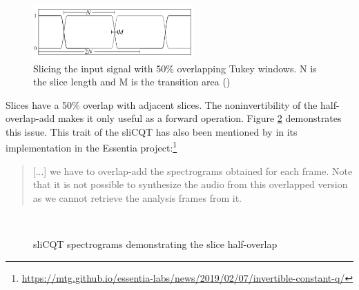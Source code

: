 \documentclass[report.tex]{subfiles}
\begin{document}
\begin{figure}[ht]
	\centering
	\includegraphics[width=0.55\textwidth]{./images-misc/slicq_windows.png}
	\caption{Slicing the input signal with 50\% overlapping Tukey windows. N is the slice length and M is the transition area (\cite{slicq})}
	\label{fig:slicqtukeys}
\end{figure}

Slices have a 50\% overlap with adjacent slices. The noninvertibility of the half-overlap-add makes it only useful as a forward operation. Figure \ref{fig:slicqoverlaps} demonstrates this issue. This trait of the sliCQT has also been mentioned by in its implementation in the Essentia project:\footnote{\url{https://mtg.github.io/essentia-labs/news/2019/02/07/invertible-constant-q/}}

\begin{quote}
	[...] we have to overlap-add the spectrograms obtained for each frame. Note that it is not possible to synthesize the audio from this overlapped version as we cannot retrieve the analysis frames from it.
\end{quote}

\begin{figure}[ht]
	\centering
	\\
	\caption{sliCQT spectrograms demonstrating the slice half-overlap}
	\label{fig:slicqoverlaps}
\end{figure}
\end{document}
